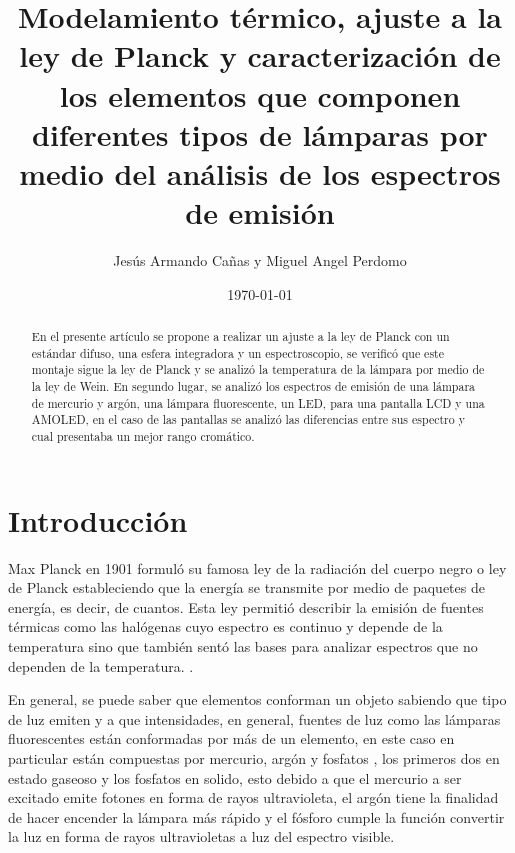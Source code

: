 \documentclass[twocolumn]{article}
\begin{document}
\title{Modelamiento térmico, ajuste a la ley de Planck y caracterización de los elementos que componen  diferentes tipos de lámparas por medio del análisis de los espectros de emisión}
\author{Jesús Armando Cañas y Miguel Angel Perdomo }

\date{\today}



\maketitle


\begin{abstract}
    
    En el presente artículo se propone a realizar un ajuste a la ley de Planck con un estándar difuso, una esfera integradora y un espectroscopio, se verificó que este montaje sigue la ley de Planck y se analizó la temperatura de la lámpara por medio de la ley de Wein. En segundo lugar, se analizó los espectros de emisión de una lámpara de mercurio y argón, una lámpara fluorescente, un LED, para una pantalla LCD y una AMOLED, en el caso de las pantallas se analizó las diferencias entre sus espectro y cual presentaba un mejor rango cromático.
\end{abstract}

\section{Introducción}
Max Planck en 1901 formuló su famosa ley de la radiación del cuerpo negro o ley de Planck estableciendo que la energía se transmite por medio de paquetes de energía, es decir, de cuantos. Esta ley permitió describir la emisión de fuentes térmicas como las halógenas cuyo espectro es continuo y depende de la temperatura  sino que también sentó las bases para analizar espectros que no dependen de la temperatura. \cite{Planck1901}.

En general, se puede saber que elementos conforman un objeto sabiendo que tipo de luz emiten y a que intensidades, en general, fuentes de luz como las lámparas fluorescentes están conformadas por más de un elemento, en este caso en particular están compuestas por mercurio, argón y fosfatos \cite{Lamptech2011}, los primeros dos en estado gaseoso y los fosfatos en solido, esto debido a que el mercurio a ser excitado emite fotones en forma de rayos ultravioleta, el argón tiene la finalidad de hacer encender la lámpara más rápido \cite{moon1936scientific} y el fósforo cumple la función convertir la luz en forma de rayos ultravioletas a luz del espectro visible.
\end{document}
